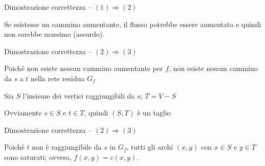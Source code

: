 \begin{frame}{Dimostrazione correttezza -- $(1) \Rightarrow (2)$}


\BIL
\item Se esistesse un cammino aumentante, il flusso potrebbe essere aumentato e quindi non sarebbe massimo (assurdo).
\EIL

\end{frame}

\begin{frame}{Dimostrazione correttezza -- $(2) \Rightarrow (3)$}

\vspace{-9pt}


\begin{center}
\end{center}

\small
\BI
\item Poiché non esiste nessun cammino aumentante per $f$, non esiste nessun cammino
da $s$ a $t$ nella rete residua $G_f$
\item Sia $S$ l'insieme dei vertici raggiungibili da $s$; $T=V-S$
\item Ovviamente $s \in S$ e $t \in T$, quindi $(S,T)$ è un taglio
\EI

\end{frame}


\begin{frame}{Dimostrazione correttezza -- $(2) \Rightarrow (3)$}

\vspace{-9pt}

\begin{center}
\end{center}

\small
\BI
\item Poiché $t$ non è raggiungibile da $s$ in $G_f$, tutti gli
archi $(x,y)$ con $x \in S$ e $y \in T$ sono saturati;  ovvero, $f(x,y) = c(x,y)$. 
\EI

\end{frame}

